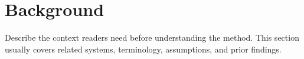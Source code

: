 \section{Background}
\label{sec:background}

Describe the context readers need before understanding the method. This section
usually covers related systems, terminology, assumptions, and prior findings.
